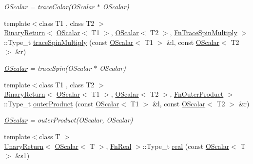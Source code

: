 \begin{DoxyCompactItemize}
\begin{DoxyCompactList}\small\item\em \mbox{\hyperlink{classENSEM_1_1OScalar}{O\+Scalar}} = trace\+Color(\+O\+Scalar $\ast$ O\+Scalar) \end{DoxyCompactList}\item 
{\footnotesize template$<$class T1 , class T2 $>$ }\\\mbox{\hyperlink{structENSEM_1_1BinaryReturn}{Binary\+Return}}$<$ \mbox{\hyperlink{classENSEM_1_1OScalar}{O\+Scalar}}$<$ T1 $>$, \mbox{\hyperlink{classENSEM_1_1OScalar}{O\+Scalar}}$<$ T2 $>$, \mbox{\hyperlink{structENSEM_1_1FnTraceSpinMultiply}{Fn\+Trace\+Spin\+Multiply}} $>$\+::Type\+\_\+t \mbox{\hyperlink{group__obsscalar_ga4f302dae1d100fdae28fb6e784a8bc3b}{trace\+Spin\+Multiply}} (const \mbox{\hyperlink{classENSEM_1_1OScalar}{O\+Scalar}}$<$ T1 $>$ \&l, const \mbox{\hyperlink{classENSEM_1_1OScalar}{O\+Scalar}}$<$ T2 $>$ \&r)
\begin{DoxyCompactList}\small\item\em \mbox{\hyperlink{classENSEM_1_1OScalar}{O\+Scalar}} = trace\+Spin(\+O\+Scalar $\ast$ O\+Scalar) \end{DoxyCompactList}\item 
{\footnotesize template$<$class T1 , class T2 $>$ }\\\mbox{\hyperlink{structENSEM_1_1BinaryReturn}{Binary\+Return}}$<$ \mbox{\hyperlink{classENSEM_1_1OScalar}{O\+Scalar}}$<$ T1 $>$, \mbox{\hyperlink{classENSEM_1_1OScalar}{O\+Scalar}}$<$ T2 $>$, \mbox{\hyperlink{structENSEM_1_1FnOuterProduct}{Fn\+Outer\+Product}} $>$\+::Type\+\_\+t \mbox{\hyperlink{group__obsscalar_ga913f8b40c0c15203e199d1bafc122eea}{outer\+Product}} (const \mbox{\hyperlink{classENSEM_1_1OScalar}{O\+Scalar}}$<$ T1 $>$ \&l, const \mbox{\hyperlink{classENSEM_1_1OScalar}{O\+Scalar}}$<$ T2 $>$ \&r)
\begin{DoxyCompactList}\small\item\em \mbox{\hyperlink{classENSEM_1_1OScalar}{O\+Scalar}} = outer\+Product(\+O\+Scalar, O\+Scalar) \end{DoxyCompactList}\item 
{\footnotesize template$<$class T $>$ }\\\mbox{\hyperlink{structENSEM_1_1UnaryReturn}{Unary\+Return}}$<$ \mbox{\hyperlink{classENSEM_1_1OScalar}{O\+Scalar}}$<$ T $>$, \mbox{\hyperlink{structENSEM_1_1FnReal}{Fn\+Real}} $>$\+::Type\+\_\+t \mbox{\hyperlink{group__obsscalar_gaad780424129e881b69f2435599861fb2}{real}} (const \mbox{\hyperlink{classENSEM_1_1OScalar}{O\+Scalar}}$<$ T $>$ \&s1)

\end{DoxyCompactItemize}
